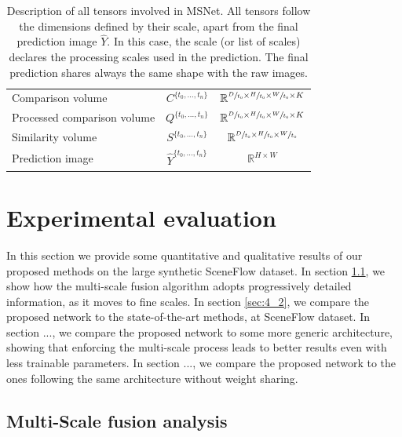 \documentclass[10pt]{article}
\begin{document}
\begin{table}[]
\begin{tabular}{ l|c|c }
    Comparison volume & $C^{ \{ t_0, ... , t_n \} }$ & $ \mathbb{R}^{ \sfrac{D}{t_0} \times \sfrac{H}{t_0} \times \sfrac{W}{t_0} \times K }  $ \rule{0pt}{3ex} \\
    
    Processed comparison volume & $Q^{ \{ t_0, ... , t_n \} }$ & $ \mathbb{R}^{ \sfrac{D}{t_0} \times \sfrac{H}{t_0} \times \sfrac{W}{t_0} \times K }  $ \rule{0pt}{3ex} \\
    
    Similarity volume & $S^{ \{ t_0, ... , t_n \} }$ & $ \mathbb{R}^{ \sfrac{D}{t_0} \times \sfrac{H}{t_0} \times \sfrac{W}{t_0}} $ \rule{0pt}{3.5ex} \\
    
    Prediction image & $\hat{Y}^{ \{ t_0, ... , t_n \} }$ & $\mathbb{R}^{ H \times W}$ \rule{0pt}{3.5ex} \\
    \hline
    \end{tabular}
    \caption{Description of all tensors involved in MSNet. All tensors follow the dimensions defined by their scale, apart from the final prediction image $\hat{Y}$. In this case, the scale (or list of scales) declares the processing scales used in the prediction. The final prediction shares always the same shape with the raw images.}
    \label{tab:entity_description}
\end{table}


\section{Experimental evaluation}

In this section we provide some quantitative and qualitative results of our proposed methods on the large synthetic SceneFlow dataset. In section \ref{sec:4_1}, we show  how the multi-scale fusion algorithm adopts progressively detailed information, as it moves to fine scales. In section \ref{sec:4_2}, we compare the proposed network to the state-of-the-art methods, at SceneFlow dataset. In section ..., we compare the proposed network to some more generic architecture, showing that enforcing the multi-scale process leads to better results even with less trainable parameters. In section ..., we compare the proposed network to the ones following the same architecture without weight sharing.



\subsection{Multi-Scale fusion analysis} \label{sec:4_1}
\end{document}

